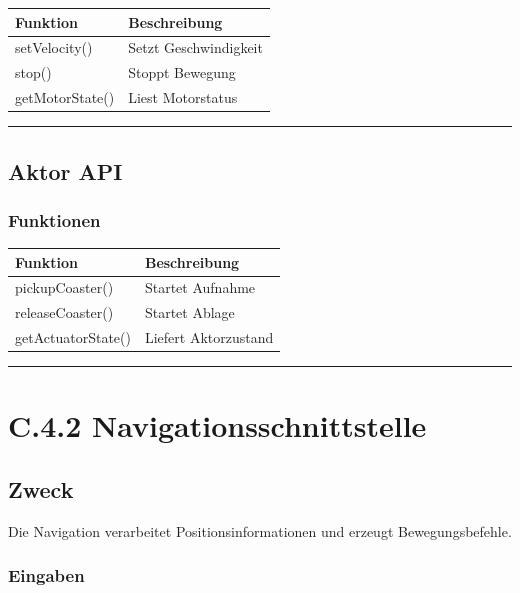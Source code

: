 \documentclass[
]{article}
\begin{document}
\begin{longtable}[]{@{}ll@{}}
\toprule\noalign{}
Funktion & Beschreibung \\
\midrule\noalign{}
\endhead
\bottomrule\noalign{}
\endlastfoot
setVelocity() & Setzt Geschwindigkeit \\
stop() & Stoppt Bewegung \\
getMotorState() & Liest Motorstatus \\
\end{longtable}

\begin{center}\rule{0.5\linewidth}{0.5pt}\end{center}

\subsection{Aktor API}\label{aktor-api}

\subsubsection{Funktionen}\label{funktionen-7}

\begin{longtable}[]{@{}ll@{}}
\toprule\noalign{}
Funktion & Beschreibung \\
\midrule\noalign{}
\endhead
\bottomrule\noalign{}
\endlastfoot
pickupCoaster() & Startet Aufnahme \\
releaseCoaster() & Startet Ablage \\
getActuatorState() & Liefert Aktorzustand \\
\end{longtable}

\begin{center}\rule{0.5\linewidth}{0.5pt}\end{center}

\section{C.4.2
Navigationsschnittstelle}\label{c.4.2-navigationsschnittstelle}

\subsection{Zweck}\label{zweck-6}

Die Navigation verarbeitet Positionsinformationen und erzeugt
Bewegungsbefehle.

\subsubsection{Eingaben}\label{eingaben-1}
\end{document}
